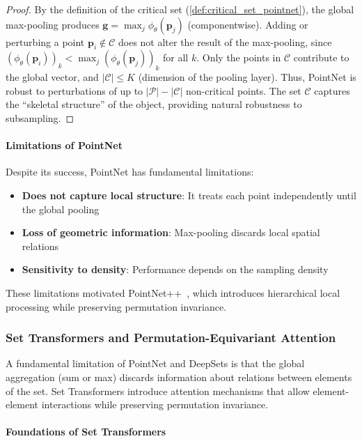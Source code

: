 \begin{proof}
By the definition of the critical set (\autoref{def:critical_set_pointnet}), the global max-pooling produces $\mathbf{g} = \max_j \phi_\theta(\mathbf{p}_j)$ (componentwise). Adding or perturbing a point $\mathbf{p}_i \notin \mathcal{C}$ does not alter the result of the max-pooling, since $(\phi_\theta(\mathbf{p}_i))_k < \max_j (\phi_\theta(\mathbf{p}_j))_k$ for all $k$. Only the points in $\mathcal{C}$ contribute to the global vector, and $|\mathcal{C}| \leq K$ (dimension of the pooling layer). Thus, PointNet is robust to perturbations of up to $|\mathcal{P}| - |\mathcal{C}|$ non-critical points. The set $\mathcal{C}$ captures the ``skeletal structure'' of the object, providing natural robustness to subsampling.
\end{proof}

\paragraph{Limitations of PointNet}

Despite its success, PointNet has fundamental limitations:

\begin{itemize}
    \item \textbf{Does not capture local structure}: It treats each point independently until the global pooling
    \item \textbf{Loss of geometric information}: Max-pooling discards local spatial relations
    \item \textbf{Sensitivity to density}: Performance depends on the sampling density
\end{itemize}

These limitations motivated PointNet++~\citep{qi2017pointnetplus}, which introduces hierarchical local processing while preserving permutation invariance.

\subsubsection{Set Transformers and Permutation-Equivariant Attention}

A fundamental limitation of PointNet and DeepSets is that the global aggregation (sum or max) discards information about relations between elements of the set. Set Transformers introduce attention mechanisms that allow element-element interactions while preserving permutation invariance.

\paragraph{Foundations of Set Transformers}


